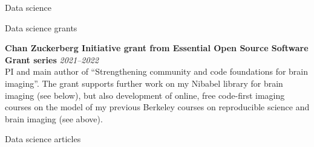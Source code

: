 \documentclass{cv}
\newcommand{\PlaceDateNote}[3]{{\bf #1} \hfill {\em #2} \\#3}
\begin{document}
\begin{cvSection}{Data science}
\begin{cvSubSection}{Reproducible science}
{\end{cvSubSection}

\begin{cvSubSection}{Data science grants}

\PlaceDateNote{Chan Zuckerberg Initiative grant from Essential Open Source
    Software Grant series}{2021--2022} {PI and main author of ``Strengthening
    community and code foundations for brain imaging''. The grant supports
    further work on my Nibabel library for brain imaging (see below), but also
    development of online, free code-first imaging courses on the model of my
    previous Berkeley courses on reproducible science and brain imaging (see
    above).}

\end{cvSubSection}

\begin{cvSubSection}{Data science articles}

\printbibliography[heading=none,
    keyword=datascience,
    keyword=article,
notkeyword=omit]

\end{cvSubSection}

\end{cvSection}
\end{document}
